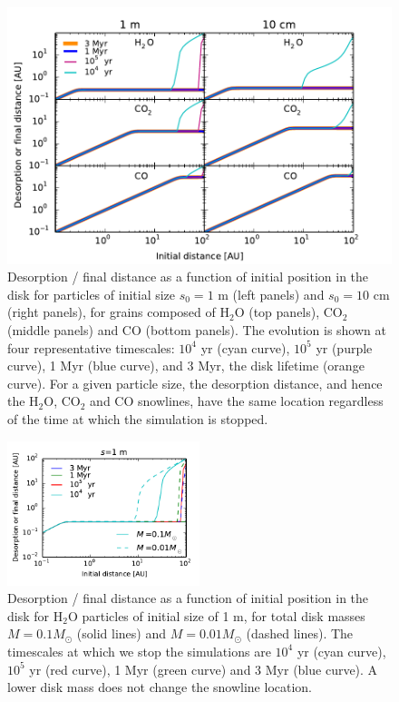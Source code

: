 \documentclass[apj]{emulateapj}
\begin{document}
\begin{figure}[t!]
\centering
\includegraphics[width=\textwidth]{time_plots.pdf}
\caption{Desorption / final distance as a function of initial position in the disk for particles of initial size $s_0=1$ m (left panels) and $s_0=10$ cm (right panels), for grains composed of H$_2$O (top panels), CO$_2$ (middle panels) and CO (bottom panels). The evolution is shown at four representative timescales: $10^4$ yr (cyan curve), $10^5$ yr (purple curve), 1 Myr (blue curve), and 3 Myr, the disk lifetime (orange curve). For a given particle size, the desorption distance, and hence the H$_2$O, CO$_2$ and CO snowlines, have the same location regardless of the time at which the simulation is stopped.}
\label{fig:timeplots}
\end{figure}

\begin{figure}[h!]
\centering
\includegraphics[width=0.5\textwidth]{desorption_distance_varying_Md.pdf}
\caption{Desorption / final distance as a function of initial position in the disk for H$_2$O particles of initial size of 1 m, for total disk masses $M=0.1 M_{\odot}$ (solid lines) and $M=0.01 M_{\odot}$ (dashed lines). The timescales at which we stop the simulations are $10^4$ yr (cyan curve), $10^5$ yr (red curve), 1 Myr (green curve) and 3 Myr (blue curve). A lower disk mass does not change the snowline location.}
\label{fig:varMd}
\end{figure}
\end{document}
